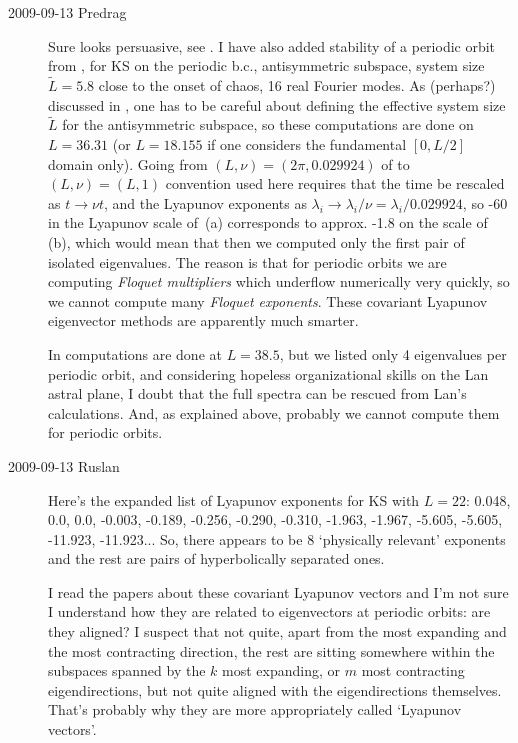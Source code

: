 \begin{description}
\item[2009-09-13 Predrag]
Sure looks persuasive, see . I have also
added stability of a periodic orbit from
, for KS on the periodic b.c.,
antisymmetric subspace, system size $\tilde{L} = 5.8$ close
to the onset of chaos, 16 real Fourier modes. As (perhaps?)
discussed in , one has to be careful about
defining the effective system size $\tilde{L}$ for the
antisymmetric subspace, so these computations are done on
$L=36.31$ (or $L = 18.155$ if one considers the fundamental
$[0,L/2]$ domain only). Going from $(L,\nu) =
(2\pi,0.029924)$ of  to $(L,\nu) =
(L,1)$ convention used here requires that the time be
rescaled as $t \to \nu t$, and the Lyapunov exponents as
$\lambda_i \to \lambda_i/ \nu = \lambda_i/ 0.029924 $, so -60
in the Lyapunov scale of \,(a)
corresponds to approx. -1.8 on the scale of
\,(b), which would mean that then we
computed only the first pair of isolated eigenvalues. The
reason is that for periodic orbits we are computing {\em
Floquet multipliers} which underflow numerically very
quickly, so we cannot compute many {\em Floquet exponents}.
These covariant Lyapunov eigenvector methods are apparently
much smarter.

In  computations are done at $L = 38.5$,
but we listed only 4 eigenvalues per periodic orbit, and
considering hopeless organizational skills on the Lan astral
plane, I doubt that the full spectra can be rescued from
Lan's calculations. And, as explained above, probably we cannot
compute them for periodic orbits.

\item[2009-09-13 Ruslan]
 Here's the expanded list of Lyapunov exponents for KS with $L = 22$:
 0.048,    0.0,    0.0,   -0.003,   -0.189,   -0.256,   -0.290,   -0.310,
-1.963,   -1.967,   -5.605,   -5.605,  -11.923,  -11.923...
So, there appears to be 8 `physically relevant' exponents and
the rest are pairs of hyperbolically separated ones.

I read
the papers about these covariant Lyapunov vectors and I'm not
sure I understand how they are related to eigenvectors at
periodic orbits: are they aligned?  I suspect that not quite,
apart from the most expanding and the most contracting
direction, the rest are sitting somewhere within the
subspaces spanned by the $k$ most expanding, or $m$ most
contracting eigendirections, but not quite aligned with the
eigendirections themselves.  That's probably why they are
more appropriately called `Lyapunov vectors'.


\end{description}
